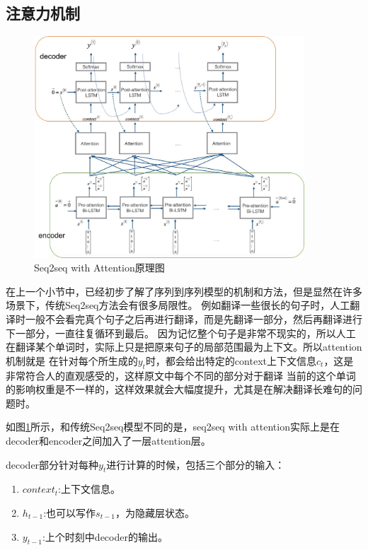 \documentclass[supercite]{HustGraduPaper}
\theoremstyle{definition}
\begin{document}
\subsection{注意力机制}
\begin{figure}[H] %
  \centering %
  \includegraphics[width=0.9\textwidth]{images/attention.jpg} %
  \caption{Seq2seq with Attention原理图} %
  \label{Fig.attention} %
\end{figure}
在上一个小节中，已经初步了解了序列到序列模型的机制和方法，但是显然在许多场景下，传统Seq2seq方法会有很多局限性。
例如翻译一些很长的句子时，人工翻译时一般不会看完真个句子之后再进行翻译，而是先翻译一部分，然后再翻译进行下一部分，一直往复循环到最后。
因为记忆整个句子是非常不现实的，所以人工在翻译某个单词时，实际上只是把原来句子的局部范围最为上下文。所以attention机制就是
在针对每个所生成的$y_{t}$时，都会给出特定的context上下文信息$c_{t}$，这是非常符合人的直观感受的，这样原文中每个不同的部分对于翻译
当前的这个单词的影响权重是不一样的，这样效果就会大幅度提升，尤其是在解决翻译长难句的问题时。

如图\ref{Fig.attention}所示，和传统Seq2seq模型不同的是，seq2seq with attention实际上是在decoder和encoder之间加入了一层attention层。

decoder部分针对每种$y_t$进行计算的时候，包括三个部分的输入：
\begin{enumerate}
  \item $context_t$:上下文信息。
  \item $h_{t-1}$:也可以写作$s_{t-1}$，为隐藏层状态。
  \item $y_{t-1}$:上个时刻中decoder的输出。
\end{enumerate}
\end{document}
